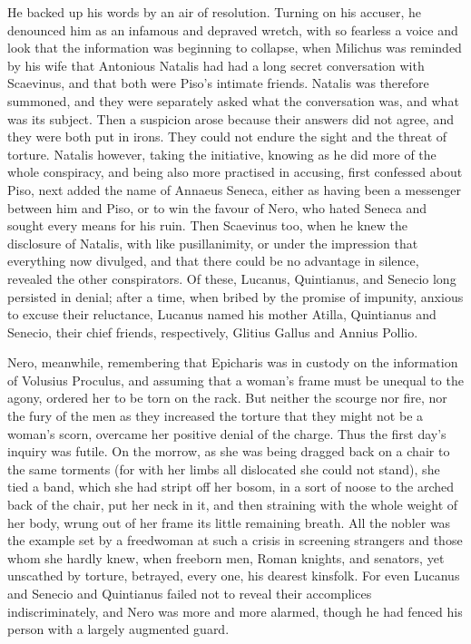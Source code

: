 
He backed up his words by an air of resolution. Turning on his accuser, he denounced him as an infamous and depraved wretch, with so fearless a voice and look that the information was beginning to collapse, when Milichus was reminded by his wife that Antonious Natalis had had a long secret conversation with Scaevinus, and that both were Piso's intimate friends. Natalis was therefore summoned, and they were separately asked what the conversation was, and what was its subject. Then a suspicion arose because their answers did not agree, and they were both put in irons. They could not endure the sight and the threat of torture. Natalis however, taking the initiative, knowing as he did more of the whole conspiracy, and being also more practised in accusing, first confessed about Piso, next added the name of Annaeus Seneca, either as having been a messenger between him and Piso, or to win the favour of Nero, who hated Seneca and sought every means for his ruin. Then Scaevinus too, when he knew the disclosure of Natalis, with like pusillanimity, or under the impression that everything now divulged, and that there could be no advantage in silence, revealed the other conspirators. Of these, Lucanus, Quintianus, and Senecio long persisted in denial; after a time, when bribed by the promise of impunity, anxious to excuse their reluctance, Lucanus named his mother Atilla, Quintianus and Senecio, their chief friends, respectively, Glitius Gallus and Annius Pollio.


Nero, meanwhile, remembering that Epicharis was in custody on the information of Volusius Proculus, and assuming that a woman's frame must be unequal to the agony, ordered her to be torn on the rack. But neither the scourge nor fire, nor the fury of the men as they increased the torture that they might not be a woman's scorn, overcame her positive denial of the charge. Thus the first day's inquiry was futile. On the morrow, as she was being dragged back on a chair to the same torments (for with her limbs all dislocated she could not stand), she tied a band, which she had stript off her bosom, in a sort of noose to the arched back of the chair, put her neck in it, and then straining with the whole weight of her body, wrung out of her frame its little remaining breath. All the nobler was the example set by a freedwoman at such a crisis in screening strangers and those whom she hardly knew, when freeborn men, Roman knights, and senators, yet unscathed by torture, betrayed, every one, his dearest kinsfolk. For even Lucanus and Senecio and Quintianus failed not to reveal their accomplices indiscriminately, and Nero was more and more alarmed, though he had fenced his person with a largely augmented guard.

